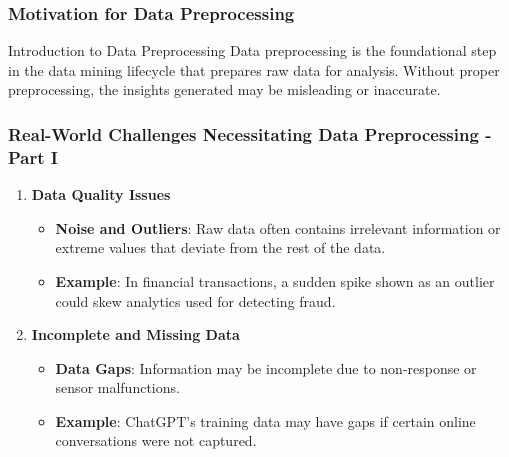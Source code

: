 \documentclass[aspectratio=169]{beamer}
\begin{document}
\begin{frame}[fragile]
    \frametitle{Motivation for Data Preprocessing}
    \begin{block}{Introduction to Data Preprocessing}
        Data preprocessing is the foundational step in the data mining lifecycle that prepares raw data for analysis. Without proper preprocessing, the insights generated may be misleading or inaccurate.
    \end{block}
\end{frame}

\begin{frame}[fragile]
    \frametitle{Real-World Challenges Necessitating Data Preprocessing - Part I}
    \begin{enumerate}
        \item \textbf{Data Quality Issues}
        \begin{itemize}
            \item \textbf{Noise and Outliers}: Raw data often contains irrelevant information or extreme values that deviate from the rest of the data.
            \item \textbf{Example}: In financial transactions, a sudden spike shown as an outlier could skew analytics used for detecting fraud.
        \end{itemize}
        
        \item \textbf{Incomplete and Missing Data}
        \begin{itemize}
            \item \textbf{Data Gaps}: Information may be incomplete due to non-response or sensor malfunctions.
            \item \textbf{Example}: ChatGPT's training data may have gaps if certain online conversations were not captured.
        \end{itemize}
    \end{enumerate}
\end{frame}
\end{document}
